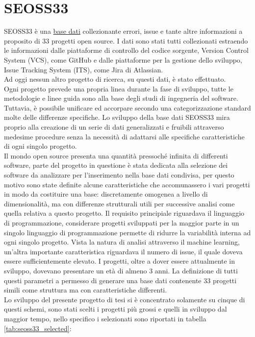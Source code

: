 \documentclass[%
    corpo=12pt,
    twoside,
    oldstyle,
    autoretitolo,
    greek,
    evenboxes,
]{toptesi}
\begin{document}
\section{SEOSS33}
SEOSS33\cite{SEOSS33} è una \href{https://doi.org/10.7910/DVN/PDDZ4Q}{base dati} collezionante errori, issue e tante altre informazioni a proposito di 33 progetti open source. I dati sono stati tutti collezionati estraendo le informazioni dalle piattaforme di controllo del codice sorgente, Version Control System (VCS), come GitHub e dalle piattaforme per la gestione dello sviluppo, Issue Tracking System (ITS), come Jira di Atlassian.\\
Ad oggi nessun altro progetto di ricerca, su questi dati, è stato effettuato.\\
Ogni progetto prevede una propria linea durante la fase di sviluppo, tutte le metodologie e linee guida sono alla base degli studi di ingegneria del software. Tuttavia, è possibile unificare ed accorpare secondo una categorizzazione standard molte delle differenze specifiche. Lo sviluppo della base dati SEOSS33 mira proprio alla creazione di un serie di dati generalizzati e fruibili attraverso medesime procedure senza la necessità di adattarsi alle specifiche caratteristiche di ogni singolo progetto.\\
Il mondo open source presenta una quantità pressoché infinita di differenti software, parte del progetto in questione è stata dedicata alla selezione dei software da analizzare per l'inserimento nella base dati condivisa, per questo motivo sono state definite alcune caratteristiche che accomunassero i vari progetti in modo da costituire una base: discretamente omogenea a livello di dimensionalità, ma con differenze strutturali utili per successive analisi come quella relativa a questo progetto. Il requisito principiale riguardava il linguaggio di programmazione, considerare progetti sviluppati per la maggior parte in un singolo linguaggio di programmazione permette di ridurre la variabilità interna ad ogni singolo progetto. Vista la natura di analisi attraverso il machine learning, un'altra importante caratteristica riguardava il numero di issue, il quale doveva essere sufficientemente elevato. I progetti, oltre a dover essere attualmente in sviluppo, dovevano presentare un età di almeno 3 anni. La definizione di tutti questi parametri a permesso di generare una base dati contenente 33 progetti simili come struttura ma con caratteristiche differenti.\\
Lo sviluppo del presente progetto di tesi si è concentrato solamente su cinque di questi schemi, sono stati scelti i progetti più grossi e quelli in sviluppo dal maggior tempo, nello specifico i selezionati sono riportati in tabella \ref{tab:seoss33_selected}:
\end{document}
